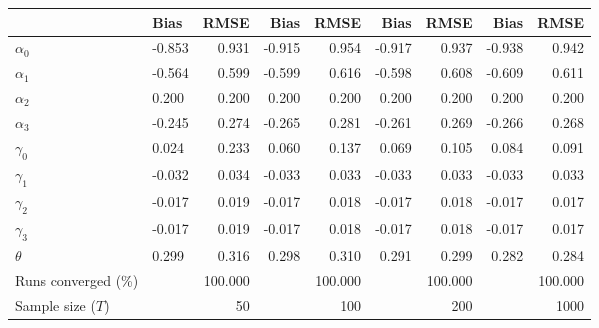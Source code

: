 
\begin{tabular}[t]{llrrrrrrr}
\toprule
  & Bias & RMSE & Bias & RMSE & Bias & RMSE & Bias & RMSE\\
\midrule
$\alpha_{0}$ & -0.853 & 0.931 & -0.915 & 0.954 & -0.917 & 0.937 & -0.938 & 0.942\\
$\alpha_{1}$ & -0.564 & 0.599 & -0.599 & 0.616 & -0.598 & 0.608 & -0.609 & 0.611\\
$\alpha_{2}$ & 0.200 & 0.200 & 0.200 & 0.200 & 0.200 & 0.200 & 0.200 & 0.200\\
$\alpha_{3}$ & -0.245 & 0.274 & -0.265 & 0.281 & -0.261 & 0.269 & -0.266 & 0.268\\
$\gamma_{0}$ & 0.024 & 0.233 & 0.060 & 0.137 & 0.069 & 0.105 & 0.084 & 0.091\\
$\gamma_{1}$ & -0.032 & 0.034 & -0.033 & 0.033 & -0.033 & 0.033 & -0.033 & 0.033\\
$\gamma_{2}$ & -0.017 & 0.019 & -0.017 & 0.018 & -0.017 & 0.018 & -0.017 & 0.017\\
$\gamma_{3}$ & -0.017 & 0.019 & -0.017 & 0.018 & -0.017 & 0.018 & -0.017 & 0.017\\
$\theta$ & 0.299 & 0.316 & 0.298 & 0.310 & 0.291 & 0.299 & 0.282 & 0.284\\
Runs converged (\%) &  & 100.000 &  & 100.000 &  & 100.000 &  & 100.000\\
Sample size ($T$) &  & 50 &  & 100 &  & 200 &  & 1000\\
\bottomrule
\end{tabular}
